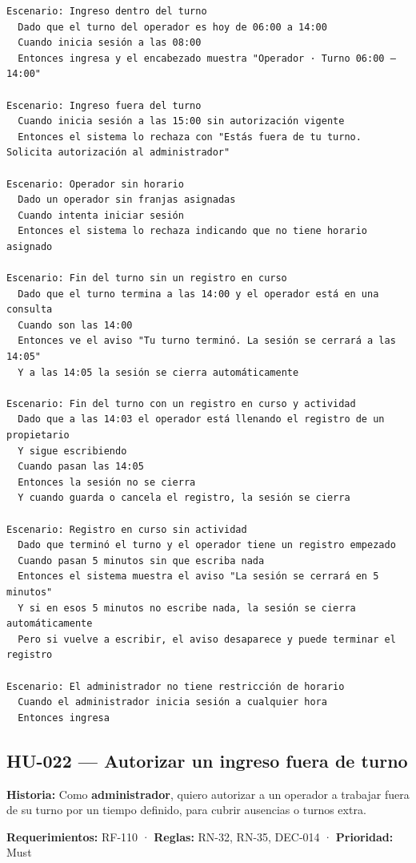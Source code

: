 \begin{lstlisting}[style=gherkin]
Escenario: Ingreso dentro del turno
  Dado que el turno del operador es hoy de 06:00 a 14:00
  Cuando inicia sesión a las 08:00
  Entonces ingresa y el encabezado muestra "Operador · Turno 06:00 – 14:00"

Escenario: Ingreso fuera del turno
  Cuando inicia sesión a las 15:00 sin autorización vigente
  Entonces el sistema lo rechaza con "Estás fuera de tu turno. Solicita autorización al administrador"

Escenario: Operador sin horario
  Dado un operador sin franjas asignadas
  Cuando intenta iniciar sesión
  Entonces el sistema lo rechaza indicando que no tiene horario asignado

Escenario: Fin del turno sin un registro en curso
  Dado que el turno termina a las 14:00 y el operador está en una consulta
  Cuando son las 14:00
  Entonces ve el aviso "Tu turno terminó. La sesión se cerrará a las 14:05"
  Y a las 14:05 la sesión se cierra automáticamente

Escenario: Fin del turno con un registro en curso y actividad
  Dado que a las 14:03 el operador está llenando el registro de un propietario
  Y sigue escribiendo
  Cuando pasan las 14:05
  Entonces la sesión no se cierra
  Y cuando guarda o cancela el registro, la sesión se cierra

Escenario: Registro en curso sin actividad
  Dado que terminó el turno y el operador tiene un registro empezado
  Cuando pasan 5 minutos sin que escriba nada
  Entonces el sistema muestra el aviso "La sesión se cerrará en 5 minutos"
  Y si en esos 5 minutos no escribe nada, la sesión se cierra automáticamente
  Pero si vuelve a escribir, el aviso desaparece y puede terminar el registro

Escenario: El administrador no tiene restricción de horario
  Cuando el administrador inicia sesión a cualquier hora
  Entonces ingresa
\end{lstlisting}

\subsection{HU-022 — Autorizar un ingreso fuera de turno}

\textbf{Historia:} Como \textbf{administrador}, quiero autorizar a un operador a trabajar fuera de su turno por un tiempo definido, para cubrir ausencias o turnos extra.


\textbf{Requerimientos:} RF-110 · \textbf{Reglas:} RN-32, RN-35, DEC-014 · \textbf{Prioridad:} Must


